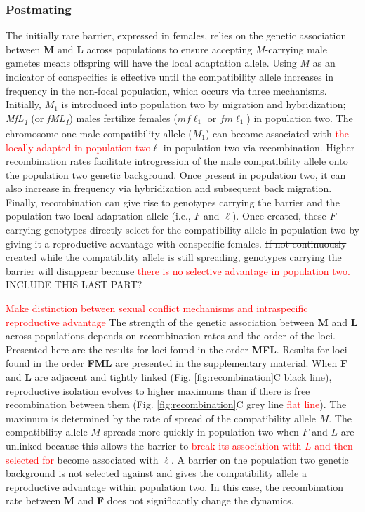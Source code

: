 \documentclass[11pt]{article}
\begin{document}
\subsubsection*{Postmating}

The initially rare barrier, expressed in females, relies on the genetic association between \textbf{M} and \textbf{L} across populations to ensure accepting $M$-carrying male gametes means offspring will have the local adaptation allele. Using $M$ as an indicator of conspecifics is effective until the compatibility allele increases in frequency in the non-focal population, which occurs via three mechanisms. Initially, $M_1$ is introduced into population two by migration and hybridization; \textit{\texorpdfstring{MfL\textsubscript{1}}{MfL 1}} (or \textit{\texorpdfstring{fML\textsubscript{1}}{fML 1}}) males fertilize females ($mf\ell_1$ or $fm\ell_1$) in population two. The chromosome one male compatibility allele ($M_1$) can become associated with \textcolor{red}{the locally adapted in population two}$\ell$ in population two via recombination. Higher recombination rates facilitate introgression of the male compatibility allele onto the population two genetic background. Once present in population two, it can also increase in frequency via hybridization and subsequent back migration. Finally, recombination can give rise to genotypes carrying the barrier  and the population two local adaptation allele (i.e., $F$ and $\ell$). Once created, these $F$-carrying genotypes directly select for the compatibility allele in population two by giving it a reproductive advantage with conspecific females. \sout{If not continuously created while the compatibility allele is still spreading, genotypes carrying the barrier will disappear because \textcolor{red}{there is no selective advantage in population two.} } INCLUDE THIS LAST PART?

\textcolor{red}{Make distinction between sexual conflict mechanisms and intraspecific reproductive advantage}
The strength of the genetic association between \textbf{M} and \textbf{L} across populations depends on recombination rates and the order of the loci. Presented here are the results for loci found in the order \textbf{MFL}. Results for loci found in the order \textbf{FML} are presented in the supplementary material.
 When \textbf{F} and \textbf{L} are adjacent and tightly linked (Fig. \ref{fig:recombination}C black line), reproductive isolation evolves to higher maximums than if there is free recombination between them (Fig. \ref{fig:recombination}C grey line \textcolor{red}{flat line}). The maximum is determined by the rate of spread of the compatibility allele $M$. The compatibility allele $M$ spreads more quickly in population two when $F$ and $L$ are unlinked because this allows the barrier to \textcolor{red}{break its association with $L$ and then selected for} become associated with $\ell$. A barrier on the population two genetic background is not selected against and gives the compatibility allele a reproductive advantage within population two. In this case, the recombination rate between \textbf{M} and \textbf{F} does not significantly change the dynamics. 
\end{document}
